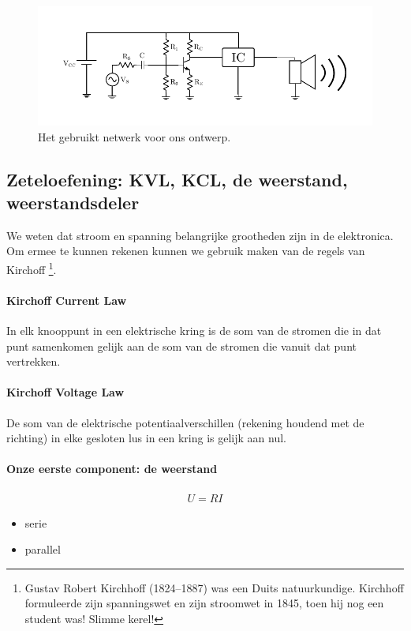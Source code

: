 \documentclass[11pt]{article}
\begin{document}
\begin{figure}[htbp]
	\centering
	\includegraphics[width=\textwidth]{volledig_schema}
	\caption{Het gebruikt netwerk voor ons ontwerp.}
	\label{fig:volledig_schema}
\end{figure}


\subsection{Zeteloefening: KVL, KCL, de weerstand, weerstandsdeler }
We weten dat stroom en spanning belangrijke grootheden zijn in de elektronica. Om ermee te kunnen rekenen kunnen we gebruik maken van de regels van Kirchoff \footnote{Gustav Robert Kirchhoff (1824–1887) was een Duits natuurkundige. Kirchhoff formuleerde zijn spanningswet en zijn stroomwet  in 1845, toen hij nog een student was!  Slimme kerel!}.

\paragraph*{Kirchoff Current Law}
In elk knooppunt in een elektrische kring is de som van de stromen die in dat punt samenkomen gelijk aan de som van de stromen die vanuit dat punt vertrekken.

\paragraph*{Kirchoff Voltage Law}
De som van de elektrische potentiaalverschillen (rekening houdend met de richting) in elke gesloten lus in een kring is gelijk aan nul.

\paragraph*{Onze eerste component: de weerstand}

\begin{align}
	U = RI 
\end{align}

\begin{itemize}
	\item serie
	\item parallel
\end{itemize}
\end{document}
